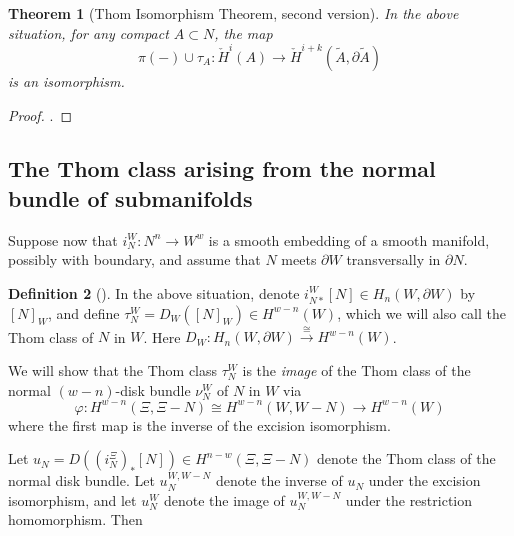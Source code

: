 \documentclass[reqno]{amsart}
\newtheorem{theorem}{Theorem}[section]
\theoremstyle{definition}
\newtheorem{definition}[theorem]{Definition}
\theoremstyle{remark}
\begin{document}
      \begin{theorem}[Thom Isomorphism Theorem, second version]
          In the above situation, for any compact $A \subset N$, the map
          \[
          \pi (-) \cup \tau_A \colon
          \check{H}^{i}(A) \to \check{H}^{i+k}(\tilde{A}, \partial \tilde{A})
          \] 
          is an isomorphism.
      \end{theorem}


      \begin{proof}
          .
      \end{proof}


      \subsection{The Thom class arising from the normal bundle
      of submanifolds}

      Suppose now that
      $i_{N}^{W} \colon N^{n} \to W^{w}$ is a smooth
      embedding of a smooth manifold, possibly with boundary,
      and assume that $N$ meets $\partial W$ transversally
      in $\partial N$.

      \begin{definition}[]
          In the above situation, denote 
          $i_{N*}^{W} \left[ N \right] \in H_n(W, \partial W)$  by
          $\left[ N \right]_W$, and define
          $\tau_N^{W} = D_W \left( \left[ N \right]_W \right) 
          \in H^{w-n}(W)$, which we will also call the Thom class of
          $N$ in $W$.
          Here $D_W \colon H_n (W, \partial W) \stackrel{\cong}{\to} 
          H^{w-n}(W)$.
      \end{definition}

      We will show that the Thom class
      $\tau_N^{W}$ is the \textit{image} of the Thom class
      of the normal $(w-n)$-disk bundle $\nu_N^{W}$ of
      $N$ in $W$ via
      \[
      \varphi \colon H^{w-n}\left( \Xi, \Xi - N \right) \cong
      H^{w-n}\left( W, W- N \right) 
      \to H^{w-n}(W)
      \] 
      where the first map is the inverse of the
      excision isomorphism.

      Let $u_N = 
      D(\left( i_{N}^{\Xi} \right)_* \left[ N \right])
      \in H^{n-w} \left( \Xi , \Xi - N \right) $ denote
      the Thom class of the normal disk bundle.
      Let $u_N^{W, W-N}$ denote the inverse
      of $u_N$ under the
      excision isomorphism, and let
      $u_N^{W}$ denote the image of $u_N^{W , W-N}$ under the
      restriction homomorphism.
      Then
\end{document}
